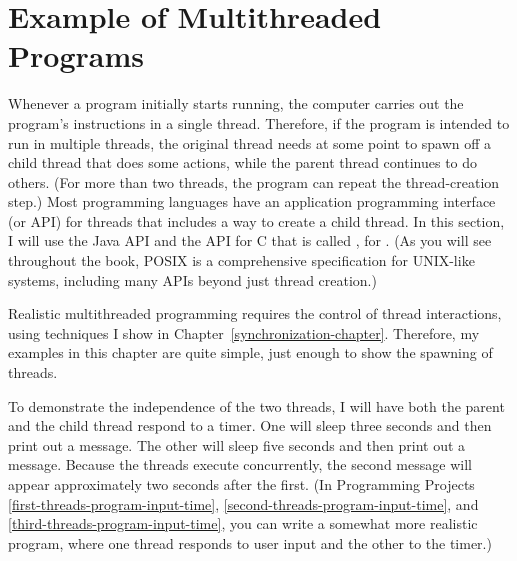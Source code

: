 \section{Example of Multithreaded Programs}\label{threads-example-section}

Whenever a program initially starts running, the computer carries
out the program's instructions in a single thread. Therefore, if the program is intended
to run in multiple threads, the original thread needs at some point to
spawn off a child thread that does some actions, while the parent
thread continues to do others.  (For more than two threads, the
program can repeat the thread-creation step.)  Most programming
languages have an application programming interface (or API) for
threads that includes a way to create a child thread.  In this
section, I will use
the Java API and the API for C that is called , for
.  (As you will see throughout the book, POSIX is a
comprehensive specification for UNIX-like systems, including many APIs
beyond just thread creation.)

Realistic multithreaded programming requires the control of thread
interactions, using techniques I show in
Chapter~\ref{synchronization-chapter}.  Therefore, my examples in
this chapter are quite simple, just enough to show the spawning of
threads.

To demonstrate the independence of the two threads, I will have both
the parent and the child thread respond to a timer.  One will sleep
three seconds and then print out a message.  The other will sleep five
seconds and then print out a message.  Because the threads execute
concurrently, the second message will appear approximately two seconds
after the first.  (In Programming Projects
\ref{first-threads-program-input-time},
\ref{second-threads-program-input-time}, and \ref{third-threads-program-input-time},
you can write a somewhat
more realistic program, where one thread responds to user input and
the other to the timer.)

